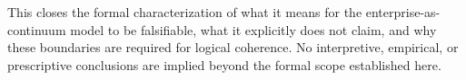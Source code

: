 \medskip

This closes the formal characterization of what it means for the
enterprise-as-continuum model to be falsifiable, what it explicitly does not
claim, and why these boundaries are required for logical coherence.
No interpretive, empirical, or prescriptive conclusions are implied beyond
the formal scope established here.
